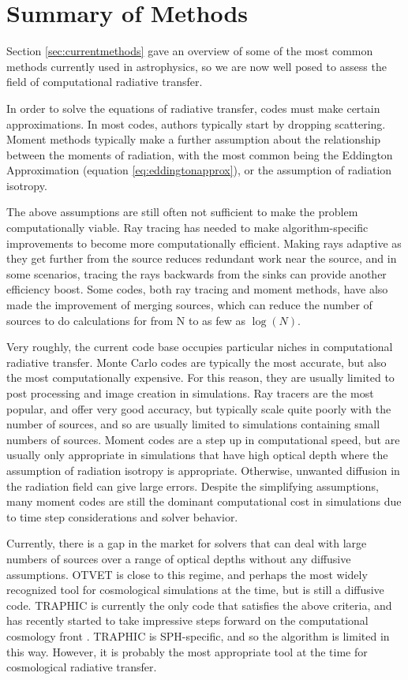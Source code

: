 \section{Summary of Methods}
\label{sec:summaryofmethods}

Section \ref{sec:currentmethods} gave an overview of some of the most common methods currently used in astrophysics, so we are now well posed to assess the field of computational radiative transfer.

In order to solve the equations of radiative transfer, codes must make certain approximations. In most codes, authors typically start by dropping scattering. Moment methods typically make a further assumption about the relationship between the moments of radiation, with the most common being the Eddington Approximation (equation \ref{eq:eddingtonapprox}), or the assumption of radiation isotropy.

The above assumptions are still often not sufficient to make the problem computationally viable. Ray tracing has needed to make algorithm-specific improvements to become more computationally efficient. Making rays adaptive as they get further from the source reduces redundant work near the source, and in some scenarios, tracing the rays backwards from the sinks can provide another efficiency boost. Some codes, both ray tracing and moment methods, have also made the improvement of merging sources, which can reduce the number of sources to do calculations for from N to as few as $\log(N)$.

Very roughly, the current code base occupies particular niches in computational radiative transfer. Monte Carlo codes are typically the most accurate, but also the most computationally expensive. For this reason, they are usually limited to post processing and image creation in simulations. Ray tracers are the most popular, and offer very good accuracy, but typically scale quite poorly with the number of sources, and so are usually limited to simulations containing small numbers of sources. Moment codes are a step up in computational speed, but are usually only appropriate in simulations that have high optical depth where the assumption of radiation isotropy is appropriate. Otherwise, unwanted diffusion in the radiation field can give large errors. Despite the simplifying assumptions, many moment codes are still the dominant computational cost in simulations due to time step considerations and solver behavior.

Currently, there is a gap in the market for solvers that can deal with large numbers of sources over a range of optical depths without any diffusive assumptions. OTVET \citep{gnedinAbel01} is close to this regime, and perhaps the most widely recognized tool for cosmological simulations at the time, but is still a diffusive code. TRAPHIC is currently the only code that satisfies the above criteria, and has recently started to take impressive steps forward on the computational cosmology front \citep{jeonEt15, jeonEt14b, jeonEt14a, rahmatiEt13b, rahmatiEt13a,jeonEt12}. TRAPHIC is SPH-specific, and so the algorithm is limited in this way. However, it is probably the most appropriate tool at the time for cosmological radiative transfer.

